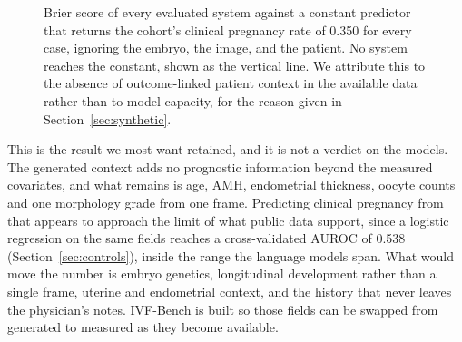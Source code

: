 \documentclass[11pt]{article}
\begin{document}
\begin{figure}[H]
\centering
{}
\caption{Brier score of every evaluated system against a constant predictor that
returns the cohort's clinical pregnancy rate of 0.350 for every case, ignoring
the embryo, the image, and the patient. No system reaches the constant, shown as
the vertical line. We attribute this to the absence of outcome-linked patient
context in the available data rather than to model capacity, for the reason given
in Section~\ref{sec:synthetic}.}
\label{fig:baserate}
\end{figure}


This is the result we most want retained, and it is not a verdict on the models.
The generated context adds no prognostic information beyond the measured
covariates, and what remains is age, AMH, endometrial thickness, oocyte counts
and one morphology grade from one frame. Predicting clinical pregnancy from that
appears to approach the limit of what public data support, since a logistic
regression on the same fields reaches a cross-validated AUROC of 0.538
(Section~\ref{sec:controls}), inside the range the language models span. What
would move the number is embryo genetics, longitudinal development rather than a
single frame, uterine and endometrial context, and the history that never leaves
the physician's notes. IVF-Bench is built so those fields can be swapped from
generated to measured as they become available.
\end{document}
